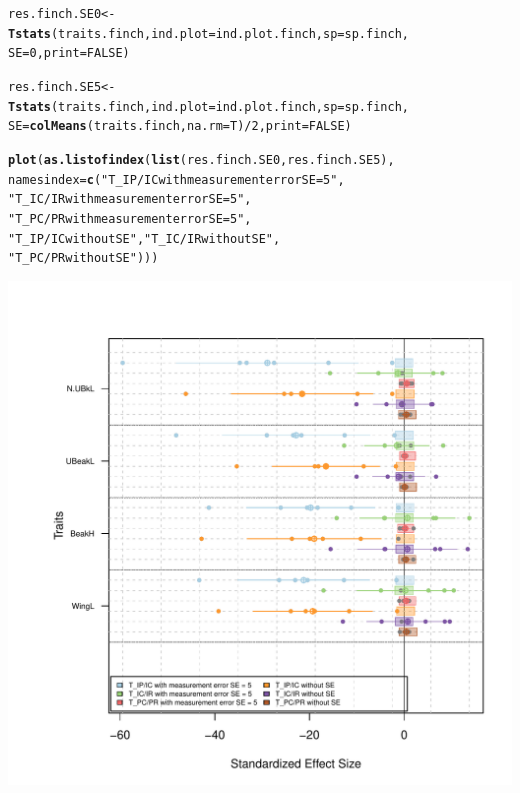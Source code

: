 \documentclass[12pt]{article}\usepackage[]{graphicx}\usepackage[]{color}
\makeatletter
\def\maxwidth{ %
  \ifdim\Gin@nat@width>\linewidth
    \linewidth
  \else
    \Gin@nat@width
  \fi
}
\newcommand{\hlnum}[1]{\textcolor[rgb]{0.686,0.059,0.569}{#1}}%
\newcommand{\hlstr}[1]{\textcolor[rgb]{0.192,0.494,0.8}{#1}}%
\newcommand{\hlopt}[1]{\textcolor[rgb]{0,0,0}{#1}}%
\newcommand{\hlstd}[1]{\textcolor[rgb]{0.345,0.345,0.345}{#1}}%
\newcommand{\hlkwb}[1]{\textcolor[rgb]{0.69,0.353,0.396}{#1}}%
\newcommand{\hlkwc}[1]{\textcolor[rgb]{0.333,0.667,0.333}{#1}}%
\newcommand{\hlkwd}[1]{\textcolor[rgb]{0.737,0.353,0.396}{\textbf{#1}}}%
\newenvironment{kframe}{%
 \def\at@end@of@kframe{}%
 \ifinner\ifhmode%
  \def\at@end@of@kframe{\end{minipage}}%
  \begin{minipage}{\columnwidth}%
 \fi\fi%
 \def\FrameCommand##1{\hskip\@totalleftmargin \hskip-\fboxsep
 \colorbox{shadecolor}{##1}\hskip-\fboxsep
     \hskip-\linewidth \hskip-\@totalleftmargin \hskip\columnwidth}%
 \MakeFramed {\advance\hsize-\width
   \@totalleftmargin\z@ \linewidth\hsize
   \@setminipage}}%
 {\par\unskip\endMakeFramed%
 \at@end@of@kframe}
\newenvironment{knitrout}{}{} %
\makeatother
\begin{document}
\begin{knitrout}
\color{fgcolor}\begin{kframe}
\begin{alltt}
\hlstd{res.finch.SE0} \hlkwb{<-} \hlkwd{Tstats}\hlstd{(traits.finch,} \hlkwc{ind.plot} \hlstd{= ind.plot.finch,} \hlkwc{sp} \hlstd{= sp.finch,}
                        \hlkwc{SE} \hlstd{=} \hlnum{0}\hlstd{,} \hlkwc{print} \hlstd{=} \hlnum{FALSE}\hlstd{)}

\hlstd{res.finch.SE5} \hlkwb{<-} \hlkwd{Tstats}\hlstd{(traits.finch,} \hlkwc{ind.plot} \hlstd{= ind.plot.finch,} \hlkwc{sp} \hlstd{= sp.finch,}
                        \hlkwc{SE} \hlstd{=} \hlkwd{colMeans}\hlstd{(traits.finch,} \hlkwc{na.rm} \hlstd{= T)}\hlopt{/}\hlnum{2}\hlstd{,} \hlkwc{print} \hlstd{=} \hlnum{FALSE}\hlstd{)}

\hlkwd{plot}\hlstd{(}\hlkwd{as.listofindex}\hlstd{(}\hlkwd{list}\hlstd{(res.finch.SE0, res.finch.SE5),}
                    \hlkwc{namesindex} \hlstd{=} \hlkwd{c}\hlstd{(}\hlstr{"T_IP/IC with measurement error SE = 5"}\hlstd{,}
                                   \hlstr{"T_IC/IR with measurement error SE = 5"}\hlstd{,}
                                   \hlstr{"T_PC/PR with measurement error SE = 5"}\hlstd{,}
                                   \hlstr{"T_IP/IC without SE"}\hlstd{,} \hlstr{"T_IC/IR without SE"}\hlstd{,}
                                   \hlstr{"T_PC/PR without SE"}\hlstd{)))}
\end{alltt}
\end{kframe}

{\centering \includegraphics[width=\maxwidth]{figure/unnamed-chunk-39-1} 

}



\end{knitrout}
  
\end{document}
